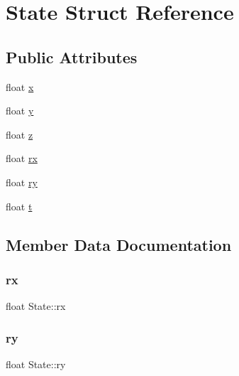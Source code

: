 \hypertarget{structState}{}\section{State Struct Reference}
\label{structState}
\subsection*{Public Attributes}
\begin{DoxyCompactItemize}
\item 
float \hyperlink{structState_a9948cc668f49246582cfd131b7928f7e}{x}
\item 
float \hyperlink{structState_a89572abb38dea3b1a780ede589a2d59b}{y}
\item 
float \hyperlink{structState_aed6ded85740f752ec9c5c2ca499da5a9}{z}
\item 
float \hyperlink{structState_a44129661bc65bbbb6147793fd196c89f}{rx}
\item 
float \hyperlink{structState_a9644786d1cc6a604052cc8eac719b888}{ry}
\item 
float \hyperlink{structState_ab1a06cd5c56832f61483d897879e2b35}{t}
\end{DoxyCompactItemize}


\subsection{Member Data Documentation}
\mbox{\label{structState_a44129661bc65bbbb6147793fd196c89f}} 
\subsubsection{\texorpdfstring{rx}{rx}}
{\footnotesize\ttfamily float State\+::rx}

\mbox{\label{structState_a9644786d1cc6a604052cc8eac719b888}} 
\subsubsection{\texorpdfstring{ry}{ry}}
{\footnotesize\ttfamily float State\+::ry}

\mbox{\label{structState_ab1a06cd5c56832f61483d897879e2b35}} 
